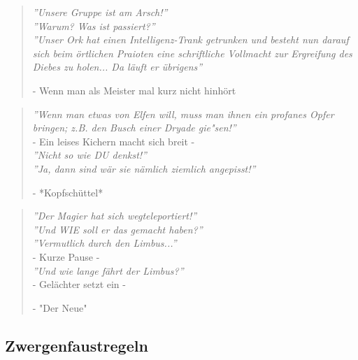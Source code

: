 \documentclass[11pt, openany]{article} %
\begin{document}
\begin{quote}
    \textit{''Unsere Gruppe ist am Arsch!''}\\
    \textit{''Warum? Was ist passiert?''}\\
    \textit{''Unser Ork hat einen Intelligenz-Trank getrunken und besteht nun darauf sich beim \"ortlichen Praioten eine schriftliche Vollmacht zur Ergreifung des Diebes zu holen... Da l\"auft er \"ubrigens''}
    \begin{flushright}
        - Wenn man als Meister mal kurz nicht hinh\"ort
    \end{flushright}
\end{quote}

\begin{quote}
     \textit{''Wenn man etwas von Elfen will, muss man ihnen ein profanes Opfer bringen; z.B. den Busch einer Dryade gie"sen!''}\\
     - Ein leises Kichern macht sich breit -\\
     \textit{''Nicht so wie DU denkst!''}\\
     \textit{''Ja, dann sind w\"ar sie n\"amlich ziemlich angepisst!''}
     \begin{flushright}
         - *Kopfsch\"uttel*
     \end{flushright}
\end{quote}

\begin{quote}
    \textit{''Der Magier hat sich wegteleportiert!''}\\
    \textit{''Und WIE soll er das gemacht haben?''}\\
    \textit{''Vermutlich durch den Limbus...''}\\
    - Kurze Pause -\\
    \textit{''Und wie lange f\"ahrt der Limbus?''}\\
    - Gel\"achter setzt ein -
    \begin{flushright}
        - "Der Neue"
    \end{flushright}
\end{quote}

\subsection{Zwergenfaustregeln}
\end{document}
